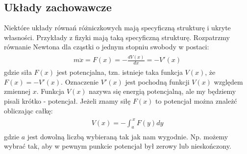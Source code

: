 \documentclass[a4paper,12pt,polish]{sphinxmanual}
\begin{document}
\subsection{Układy zachowawcze}
\label{ch1/chI022:uklady-zachowawcze}
Niektóre układy równań różniczkowych mają specyficzną strukturę i ukryte własności. Przykłady z fizyki mają taką specyficzną strukturę. Rozpatrzmy równanie Newtona dla cząstki o jednym stopniu swobody w postaci:
\label{ch1/chI022:equation-eqn1}\begin{gather}
\begin{split}m\ddot x = F(x) = -\frac{dV(x)}{dx} = - V'(x)\end{split}\label{ch1/chI022-eqn1}
\end{gather}
gdzie siła $F(x)$ jest potencjalna, tzn.  istnieje taka funkcja $V(x)$, że $F(x) = -V'(x)$.  Oznaczenie $V'(x)$ jest pochodną funkcji $V(x)$ względem zmiennej $x$. Funkcja  $V(x)$ nazywa się energią potencjalną, ale my będziemy pisali krótko - potencjał. Jeżeli znamy siłę $F(x)$ to potencjał można znależć obliczając całkę:
\label{ch1/chI022:equation-eqn2}\begin{gather}
\begin{split}V(x) = - \int_a^{\,x}  F(y) dy\end{split}\label{ch1/chI022-eqn2}
\end{gather}
gdzie $a$ jest dowolną liczbą wybieraną tak jak nam wygodnie. Np. możemy wybrać tak, aby w pewnym punkcie potencjał był zerowy lub nieskończony.
\end{document}
